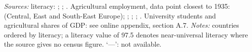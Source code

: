 \begin{table}[htbp]
\begin{threeparttable}
\begin{tablenotes}
\footnotesize
\textit{Sources:} literacy: \cite{cronin_literacy}; \cite[246--77]{kirk_literacy}; \cite[528]{bostonencikl_rast}. Agricultural employment, data point closest to 1935: \cite[181]{morysinterwarinmorys2021} (Central, East and South-East Europe); \cite{mitchelstat}; \cite[91]{biuletenis19393}; \cite[2]{ostlandinzahlen}; \cite[395, 409, 418]{sov_labour1939}. University students and agricultural shares of GDP: see online appendix, section A.7. \textit{Notes:} countries ordered by literacy; a literacy value of 97.5 denotes near-universal literacy where the source gives no census figure. `---': not available.
\end{tablenotes}
\end{threeparttable}
\end{table}
